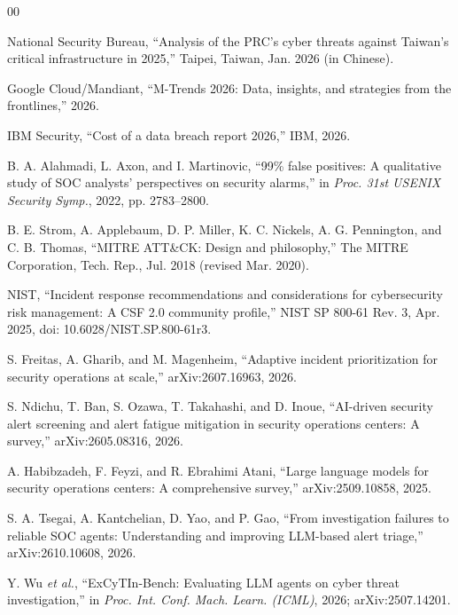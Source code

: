 \documentclass[conference]{IEEEtran}
\begin{document}
\begin{thebibliography}{00}

 National Security Bureau, ``Analysis of the PRC's
cyber threats against Taiwan's critical infrastructure in 2025,''
Taipei, Taiwan, Jan. 2026 (in Chinese).

 Google Cloud/Mandiant, ``M-Trends 2026: Data,
insights, and strategies from the frontlines,'' 2026.

 IBM Security, ``Cost of a data breach report 2026,''
IBM, 2026.

 B. A. Alahmadi, L. Axon, and I. Martinovic,
``99\% false positives: A qualitative study of SOC analysts'
perspectives on security alarms,'' in \emph{Proc. 31st USENIX Security
Symp.}, 2022, pp. 2783--2800.

 B. E. Strom, A. Applebaum, D. P. Miller,
K. C. Nickels, A. G. Pennington, and C. B. Thomas, ``MITRE ATT\&CK:
Design and philosophy,'' The MITRE Corporation, Tech. Rep., Jul. 2018
(revised Mar. 2020).

 NIST, ``Incident response recommendations and
considerations for cybersecurity risk management: A CSF 2.0 community
profile,'' NIST SP 800-61 Rev. 3, Apr. 2025,
doi: 10.6028/NIST.SP.800-61r3.

 S. Freitas, A. Gharib, and M. Magenheim,
``Adaptive incident prioritization for security operations at scale,''
arXiv:2607.16963, 2026.

 S. Ndichu, T. Ban, S. Ozawa, T. Takahashi, and
D. Inoue, ``AI-driven security alert screening and alert fatigue
mitigation in security operations centers: A survey,''
arXiv:2605.08316, 2026.

 A. Habibzadeh, F. Feyzi, and R. Ebrahimi
Atani, ``Large language models for security operations centers: A
comprehensive survey,'' arXiv:2509.10858, 2025.

 S. A. Tsegai, A. Kantchelian, D. Yao, and P. Gao,
``From investigation failures to reliable SOC agents: Understanding and
improving LLM-based alert triage,'' arXiv:2610.10608, 2026.

 Y. Wu \emph{et al.}, ``ExCyTIn-Bench:
Evaluating LLM agents on cyber threat investigation,'' in \emph{Proc.
Int. Conf. Mach. Learn. (ICML)}, 2026; arXiv:2507.14201.


\end{thebibliography}
\end{document}
